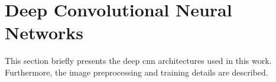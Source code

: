 \section{Deep Convolutional Neural Networks}
\label{sec:networks}

This section briefly presents the deep \ac{cnn} architectures used in this work. Furthermore, the image preprocessing and training details are described.










